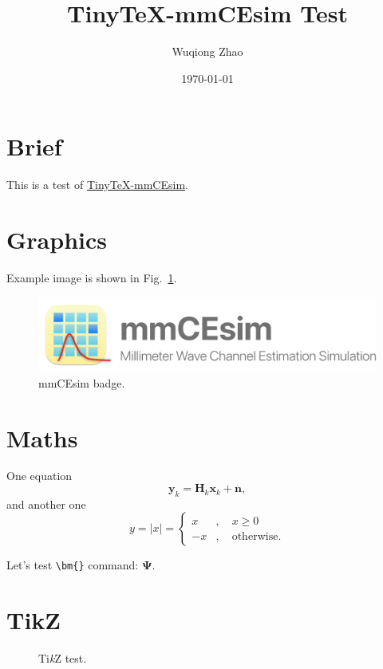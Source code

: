 \documentclass{article}
\title{TinyTeX-mmCEsim Test}
\author{Wuqiong Zhao}
\date{\today}
\begin{document}
  \maketitle

  \section{Brief}
    This is a test of \href{https://github.com/mmcesim/tinytex-mmcesim}{TinyTeX-mmCEsim}.

  \section{Graphics}
    
    Example image is shown in Fig.~\ref{fig:example}.
    \begin{figure}[htbp]
      \centering
      \includegraphics[width=\linewidth]{mmCEsim_badge.png}
      \caption{mmCEsim badge.}
      \label{fig:example}
    \end{figure}

  \section{Maths}

    One equation
    \begin{equation}
      \mathbf{y}_k=\mathbf{H}_k\mathbf{x}_k+\mathbf{n},
    \end{equation}
    and another one
    \begin{equation}
      y=|x|=
      \left\{
        \begin{aligned}
          x&,\quad x\geq0\\
          -x&,\quad\mathrm{otherwise}.
        \end{aligned}
      \right.
    \end{equation}
    
    Let's test \verb+\bm{}+ command: $\bm{\Psi}$.

  \newpage
  \section{TikZ}

    \begin{figure}[htbp]
      \centering
      \caption{Ti\textit{k}Z test.}
    \end{figure}
  
\end{document}
